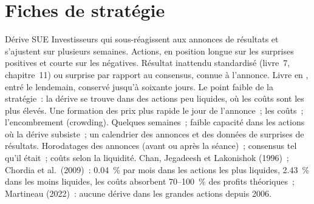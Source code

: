 \begin{omfigure}

\label{fig:s1:earnings:holds}
\end{omfigure}

\section{Fiches de stratégie}

\begin{strategyfile}{Dérive SUE}\label{strat:s1:earnings:sue}
 Investisseurs qui sous-réagissent aux annonces de résultats et s'ajustent sur plusieurs semaines.
 Actions, en position longue sur les surprises positives et courte sur les négatives.
 Résultat inattendu standardisé (livre~7, chapitre~11) ou surprise par rapport au consensus, connue à l'annonce.
 Livre en , entré le lendemain, conservé jusqu'à soixante jours.
 Le point faible de la stratégie~: la dérive se trouve dans des actions peu liquides, où les coûts sont les plus élevés.
 Une formation des prix plus rapide le jour de l'annonce~; les coûts~; l'encombrement (crowding).
 Quelques semaines~; faible capacité dans les actions où la dérive subsiste~; un calendrier des annonces et des données de surprises de résultats.
 Horodatages des annonces (avant ou après la séance)~; consensus tel qu'il était~; coûts selon la liquidité.
 Chan, Jegadeesh et Lakonishok (1996)~; Chordia et al.\ (2009)~: 0.04~\% par mois dans les actions les plus liquides, 2.43~\% dans les moins liquides, les coûts
absorbent 70--100~\% des profits théoriques~; Martineau (2022)~: aucune dérive dans les grandes actions depuis 2006.
\end{strategyfile}

